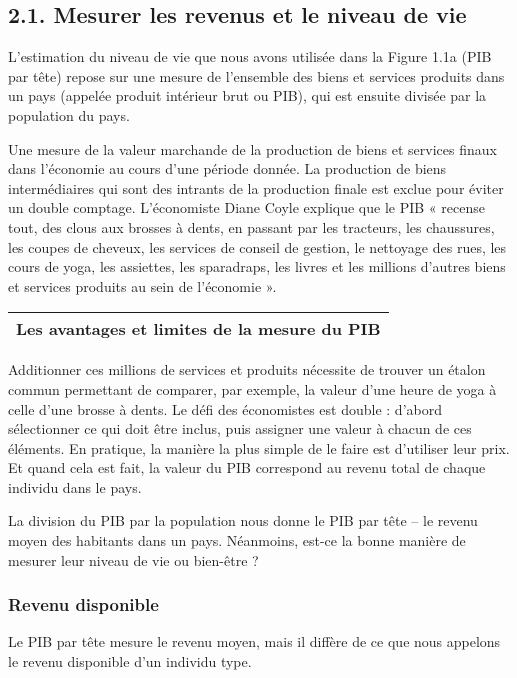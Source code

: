 \documentclass[11pt]{amsart}
\begin{document}
\hypertarget{x-2.1.-mesurer-les-revenus-et-le-niveau-de-vie}{\subsection*{2.1. Mesurer les revenus et le niveau de vie}}
L’estimation du niveau de vie que nous avons utilisée dans la Figure 1.1a (PIB par tête) repose sur une mesure de l’ensemble des biens et services produits dans un pays (appelée produit intérieur brut ou PIB), qui est ensuite divisée par la population du pays.


Une mesure de la valeur marchande de la production de biens et services finaux dans l’économie au cours d’une période donnée. La production de biens intermédiaires qui sont des intrants de la production finale est exclue pour éviter un double comptage. L’économiste Diane Coyle explique que le PIB « recense tout, des clous aux brosses à dents, en passant par les tracteurs, les chaussures, les coupes de cheveux, les services de conseil de gestion, le nettoyage des rues, les cours de yoga, les assiettes, les sparadraps, les livres et les millions d’autres biens et services produits au sein de l’économie ».


\begin{center}
\begin{tabular}{|c|}
\hline
\textbf{Les avantages et limites de la mesure du PIB} \\ 
\hline
\end{tabular}
\end{center}

Additionner ces millions de services et produits nécessite de trouver un étalon commun permettant de comparer, par exemple, la valeur d’une heure de yoga à celle d’une brosse à dents. Le défi des économistes est double : d’abord sélectionner ce qui doit être inclus, puis assigner une valeur à chacun de ces éléments. En pratique, la manière la plus simple de le faire est d’utiliser leur prix. Et quand cela est fait, la valeur du PIB correspond au revenu total de chaque individu dans le pays.


La division du PIB par la population nous donne le PIB par tête – le revenu moyen des habitants dans un pays. Néanmoins, est-ce la bonne manière de mesurer leur niveau de vie ou bien-être ?


\hypertarget{x-revenu-disponible}{\subsubsection*{Revenu disponible}}
Le PIB par tête mesure le revenu moyen, mais il diffère de ce que nous appelons le revenu disponible d’un individu type.
\end{document}
